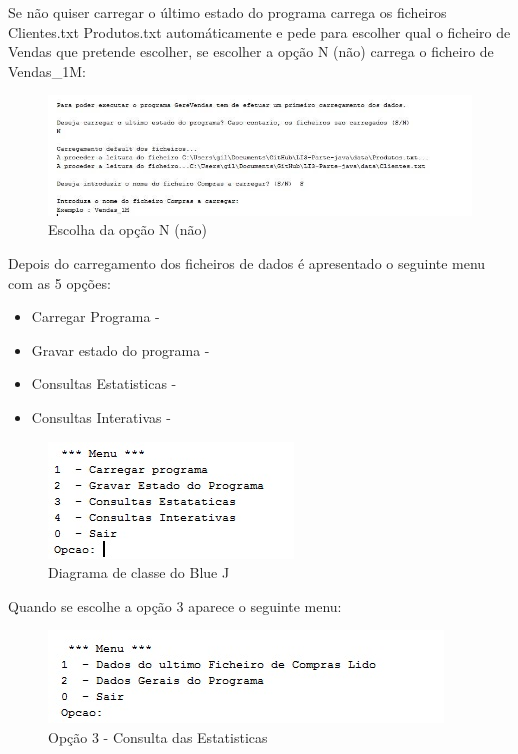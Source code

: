 Se não quiser carregar o último estado do programa carrega os ficheiros Clientes.txt Produtos.txt automáticamente e pede para escolher qual o ficheiro de Vendas que pretende escolher, se escolher a opção N (não) carrega o ficheiro de Vendas\_1M: 

\begin{figure}[h!]
	\includegraphics[scale=0.65]{menunao.jpg}  
	\caption{Escolha da opção N (não) }  
\end{figure}

Depois do carregamento dos ficheiros de dados é apresentado o seguinte menu com as 5 opções: 


\begin{itemize}
	\item Carregar Programa - 
	\item Gravar estado do programa - 
	\item Consultas Estatisticas - 
	\item Consultas Interativas  - 
\end{itemize}


\newpage	
\begin{figure}[h!]
	\includegraphics[scale=1.5]{MenuInicial.jpg}  
	\caption{Diagrama de classe do Blue J }  
\end{figure}

Quando se escolhe a opção 3 aparece o seguinte menu: 
\begin{figure}[h!]
	\includegraphics[scale=1]{ConsultasEstatisticas.jpg}  
	\caption{Opção 3 - Consulta das Estatisticas }  
\end{figure}

